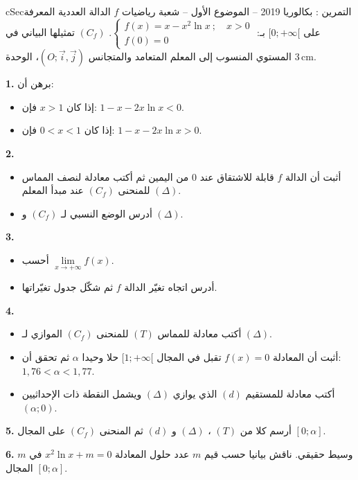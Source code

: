 \documentclass[12pt,a4paper]{article}
\newenvironment{BOX}[2]{\begin{otherlanguage}{english}\begin{arbox}{#1}{#2}}{\end{arbox}\end{otherlanguage}}
\newcounter{exo}
\newenvironment{tamrin}[1]{\stepcounter{exo}\begin{BOX}{cSec}{التمرين \theexo: #1}}{\end{BOX}}
\newenvironment{sq}{\begin{itemize}[leftmargin=2.4em,itemsep=3pt]}{\end{itemize}}
\newcommand{\qa}{\item[(أ)]}\newcommand{\qb}{\item[(ب)]}\newcommand{\qc}{\item[(جـ)]}\newcommand{\qd}{\item[(د)]}\newcommand{\qe}{\item[(هـ)]}
\newcommand{\QQ}[1]{\par\smallskip\textbf{#1.} }
\begin{document}
\begin{tamrin}{بكالوريا 2019 -- الموضوع الأول -- شعبة رياضيات}
$f$ الدالة العددية المعرفة على $[0;+\infty[$ بـ:
$\begin{cases} f(x)=x-x^2\ln x\ ;\quad x>0\\ f(0)=0\end{cases}$.
$(C_f)$ تمثيلها البياني في المستوي المنسوب إلى المعلم المتعامد والمتجانس $(O;\vec i,\vec j)$، الوحدة $3\,\text{cm}$.
\QQ{1} برهن أن:
\begin{itemize}
\item إذا كان $x>1$ فإن: $1-x-2x\ln x<0$.
\item إذا كان $0<x<1$ فإن: $1-x-2x\ln x>0$.
\end{itemize}
\QQ{2}
\begin{sq}
\qa أثبت أن الدالة $f$ قابلة للاشتقاق عند $0$ من اليمين ثم أكتب معادلة لنصف المماس $(\Delta)$ للمنحنى $(C_f)$ عند مبدأ المعلم.
\qb أدرس الوضع النسبي لـ $(C_f)$ و $(\Delta)$.
\end{sq}
\QQ{3}
\begin{sq}
\qa أحسب $\lim\limits_{x\to +\infty}f(x)$.
\qb أدرس اتجاه تغيّر الدالة $f$ ثم شكّل جدول تغيّراتها.
\end{sq}
\QQ{4}
\begin{sq}
\qa أكتب معادلة للمماس $(T)$ للمنحنى $(C_f)$ الموازي لـ $(\Delta)$.
\qb أثبت أن المعادلة $f(x)=0$ تقبل في المجال $[1;+\infty[$ حلا وحيدا $\alpha$ ثم تحقق أن: $1{,}76<\alpha<1{,}77$.
\qc أكتب معادلة للمستقيم $(d)$ الذي يوازي $(\Delta)$ ويشمل النقطة ذات الإحداثيين $(\alpha;0)$.
\end{sq}
\QQ{5} أرسم كلا من $(T)$ ، $(\Delta)$ و $(d)$ ثم المنحنى $(C_f)$ على المجال $[0;\alpha]$.
\QQ{6} $m$ وسيط حقيقي. ناقش بيانيا حسب قيم $m$ عدد حلول المعادلة $x^2\ln x+m=0$ في المجال $[0;\alpha]$.
\end{tamrin}
\end{document}
